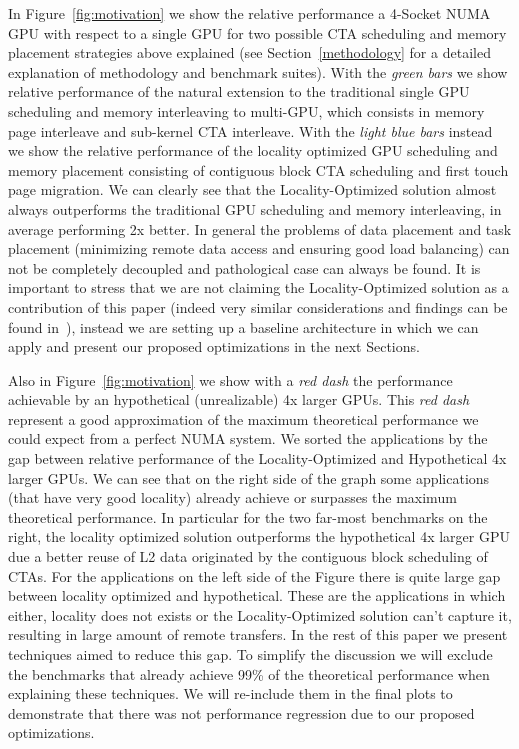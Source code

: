In Figure~\ref{fig:motivation} we show the relative performance a 4-Socket 
NUMA GPU with respect to a single GPU for two possible CTA scheduling and 
memory placement strategies above explained (see Section~\ref{methodology} 
for a detailed explanation of methodology and benchmark suites). With the 
\emph{green bars} we show relative performance of the natural extension to 
the traditional single GPU scheduling and memory interleaving to 
multi-GPU, which consists in memory page interleave and sub-kernel CTA 
interleave. With the \emph{light blue bars} instead we show the relative 
performance of the locality optimized GPU scheduling and memory placement 
consisting of contiguous block CTA scheduling and first touch page 
migration. We can clearly see that the Locality-Optimized solution almost always 
outperforms the traditional GPU scheduling and memory interleaving, in 
average performing 2x better. In general the problems of data placement and 
task placement (minimizing remote data access and ensuring good load balancing) 
can not be completely decoupled and pathological case can always be found. It 
is important to stress that we are not claiming the Locality-Optimized solution 
as a contribution of this paper (indeed very similar considerations and findings 
can be found in~\cite{Cabezas2015,Arunkumar2017}), instead we are setting up a 
baseline architecture in which we can apply and present our proposed 
optimizations in the next Sections.

Also in Figure~\ref{fig:motivation} we show with a \emph{red dash} the performance 
achievable by an hypothetical (unrealizable) 4x larger GPUs. This \emph{red dash} 
represent a good approximation of the maximum theoretical performance we 
could expect from a perfect NUMA system. We sorted the applications by the 
gap between relative performance of the Locality-Optimized and 
Hypothetical 4x larger GPUs. We can see that on the right side of the graph 
some applications (that have very good locality) already 
achieve or surpasses the maximum theoretical performance. In particular for the 
two far-most benchmarks on the right, the locality optimized solution outperforms 
the hypothetical 4x larger GPU due a better reuse of L2 data originated by 
the contiguous block scheduling of CTAs. For the applications on the left 
side of the Figure there is quite large gap between locality optimized and 
hypothetical. These are the applications in which either, locality does not 
exists or the Locality-Optimized solution can't capture it, 
resulting in large amount of remote transfers. In the rest of this paper we 
present techniques aimed to reduce this gap. To simplify the discussion we 
will exclude the benchmarks that already achieve 99\% of the theoretical 
performance when explaining these techniques. We will re-include them in the 
final plots to demonstrate that there was not performance regression due to 
our proposed optimizations.